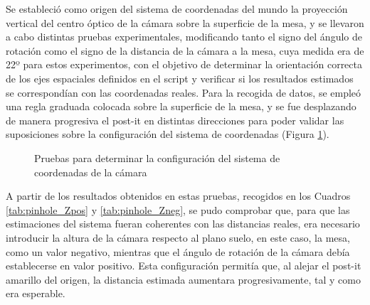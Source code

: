 Se estableció como origen del sistema de coordenadas del mundo la proyección vertical del centro óptico de la cámara sobre la superficie de la mesa, y se llevaron a cabo distintas pruebas experimentales, modificando tanto el signo del ángulo de rotación como el signo de la distancia de la cámara a la mesa, cuya medida era de 22º para estos experimentos, con el objetivo de determinar la orientación correcta de los ejes espaciales definidos en el script y verificar si los resultados estimados se correspondían con las coordenadas reales. Para la recogida de datos, se empleó una regla graduada colocada sobre la superficie de la mesa, y se fue desplazando de manera progresiva el post-it en distintas direcciones para poder validar las suposiciones sobre la configuración del sistema de coordenadas (Figura \ref{fig:prueba_ejes_camara}).

 \begin{figure}[H]
    \begin{center}
      \subcapcentertrue
      \hspace{2mm}
    \end{center}
    \caption{Pruebas para determinar la configuración del sistema de coordenadas de la cámara}
    \label{fig:prueba_ejes_camara}
  \end{figure}
  
A partir de los resultados obtenidos en estas pruebas, recogidos en los Cuadros \ref{tab:pinhole_Zpos} y \ref{tab:pinhole_Zneg}, se pudo comprobar que, para que las estimaciones del sistema fueran coherentes con las distancias reales, era necesario introducir la altura de la cámara respecto al plano suelo, en este caso, la mesa, como un valor negativo, mientras que el ángulo de rotación de la cámara debía establecerse en valor positivo. Esta configuración permitía que, al alejar el post-it amarillo del origen, la distancia estimada aumentara progresivamente, tal y como era esperable. 
  
